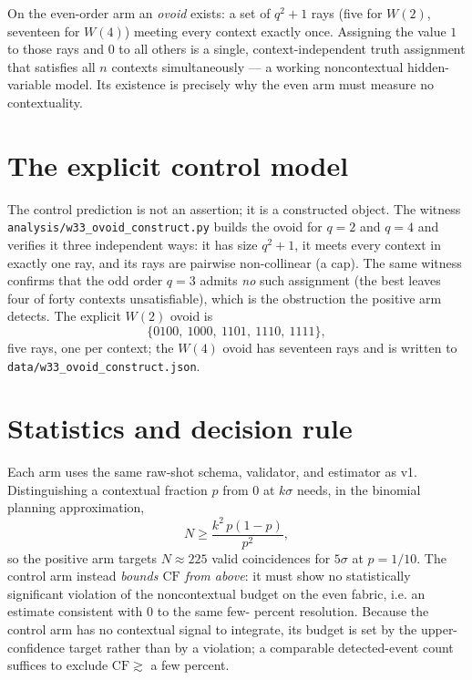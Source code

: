 \documentclass[11pt]{article}
\begin{document}
On the even-order arm an \emph{ovoid} exists: a set of $q^2+1$ rays (five for $W(2)$, seventeen for
$W(4)$) meeting every context exactly once.  Assigning the value $1$ to those rays and $0$ to all others
is a single, context-independent truth assignment that satisfies all $n$ contexts simultaneously --- a
working noncontextual hidden-variable model.  Its existence is precisely why the even arm must measure
no contextuality.

\section{The explicit control model}
The control prediction is not an assertion; it is a constructed object.  The witness
\texttt{analysis/w33\_ovoid\_construct.py} builds the ovoid for $q=2$ and $q=4$ and verifies it three
independent ways: it has size $q^2+1$, it meets every context in exactly one ray, and its rays are
pairwise non-collinear (a cap).  The same witness confirms that the odd order $q=3$ admits \emph{no}
such assignment (the best leaves four of forty contexts unsatisfiable), which is the obstruction the
positive arm detects.  The explicit $W(2)$ ovoid is
\[
  \{0100,\ 1000,\ 1101,\ 1110,\ 1111\},
\]
five rays, one per context; the $W(4)$ ovoid has seventeen rays and is written to
\texttt{data/w33\_ovoid\_construct.json}.

\section{Statistics and decision rule}
Each arm uses the same raw-shot schema, validator, and estimator as v1.  Distinguishing a contextual
fraction $p$ from $0$ at $k\sigma$ needs, in the binomial planning approximation,
\[
  N \ge \frac{k^2\,p(1-p)}{p^2},
\]
so the positive arm targets $N\approx 225$ valid coincidences for $5\sigma$ at $p=1/10$.  The control
arm instead \emph{bounds $\mathrm{CF}$ from above}: it must show no statistically significant violation
of the noncontextual budget on the even fabric, i.e. an estimate consistent with $0$ to the same few-
percent resolution.  Because the control arm has no contextual signal to integrate, its budget is set by
the upper-confidence target rather than by a violation; a comparable detected-event count suffices to
exclude $\mathrm{CF}\gtrsim$ a few percent.
\end{document}
